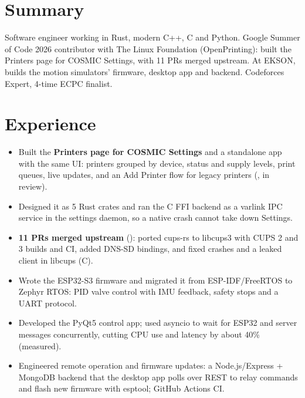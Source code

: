 \documentclass[10pt]{article}
\begin{document}

\section*{Summary}
Software engineer working in Rust, modern C++, C and Python. Google Summer of Code 2026 contributor with The Linux Foundation (OpenPrinting): built the Printers page for COSMIC Settings, with 11 PRs merged upstream. At EKSON, builds the motion simulators' firmware, desktop app and backend. Codeforces Expert, 4-time ECPC finalist.

\section*{Experience}
\begin{itemize}
  \item Built the \textbf{Printers page for COSMIC Settings} and a standalone app with the same UI: printers grouped by device, status and supply levels, print queues, live updates, and an Add Printer flow for legacy printers (, in review).
  \item Designed it as 5 Rust crates and ran the C FFI backend as a varlink IPC service in the settings daemon, so a native crash cannot take down Settings.
  \item \textbf{11 PRs merged upstream} (): ported cups-rs to libcups3 with CUPS 2 and 3 builds and CI, added DNS-SD bindings, and fixed crashes and a leaked client in libcups (C).
\end{itemize}
\begin{itemize}
  \item Wrote the ESP32-S3 firmware and migrated it from ESP-IDF/FreeRTOS to Zephyr RTOS: PID valve control with IMU feedback, safety stops and a UART protocol.
  \item Developed the PyQt5 control app; used asyncio to wait for ESP32 and server messages concurrently, cutting CPU use and latency by about 40\% (measured).
  \item Engineered remote operation and firmware updates: a Node.js/Express + MongoDB backend that the desktop app polls over REST to relay commands and flash new firmware with esptool; GitHub Actions CI.
\end{itemize}
\end{document}
